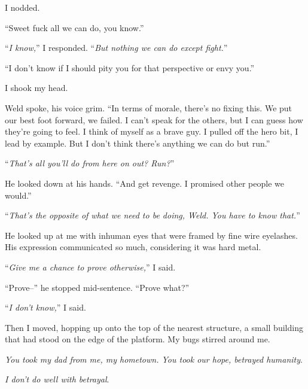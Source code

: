 I nodded.



``Sweet fuck all we can do, you know.''



``\emph{I know,}'' I responded.  ``\emph{But nothing we can do except fight.}''



``I don't know if I should pity you for that perspective or envy you.''



I shook my head.



Weld spoke, his voice grim.  ``In terms of morale, there's no fixing this.  We put our best foot forward, we failed.  I can't speak for the others, but I can guess how they're going to feel.  I think of myself as a brave guy.  I pulled off the hero bit, I lead by example.  But I don't think there's anything we can do but run.''



``\emph{That's all you'll do from here on out?  Run?}''



He looked down at his hands.  ``And get revenge.  I promised other people we would.''



``\emph{That's the opposite of what we need to be doing, Weld.  You have to know that.}''



He looked up at me with inhuman eyes that were framed by fine wire eyelashes.  His expression communicated so much, considering it was hard metal.



``\emph{Give me a chance to prove otherwise,}'' I said.



``Prove--'' he stopped mid-sentence.  ``Prove what?''



``\emph{I don't know,}'' I said.



Then I moved, hopping up onto the top of the nearest structure, a small building that had stood on the edge of the platform.  My bugs stirred around me.



\emph{You took my dad from me, my hometown.  You took our hope, betrayed humanity}.



\emph{I don't do well with betrayal}.



